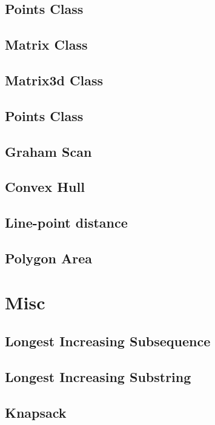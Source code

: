 \documentclass[a4paper]{article}
\begin{document}
\begin{multicols}{3}
\subsection{Points Class}


\subsection{Matrix Class}


\subsection{Matrix3d Class}


\subsection{Points Class}


\subsection{Graham Scan}


\subsection{Convex Hull}


\subsection{Line-point distance}


\subsection{Polygon Area}


\section{Misc}
\subsection{Longest Increasing Subsequence}


\subsection{Longest Increasing Substring}


\subsection{Knapsack}


\end{multicols}
\end{document}
